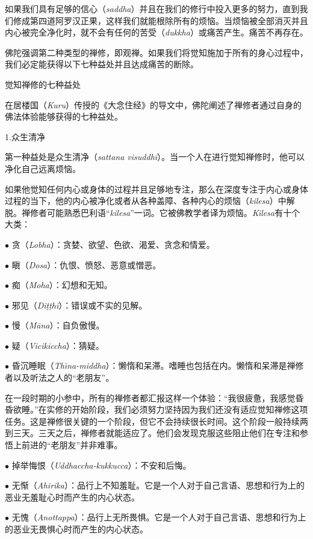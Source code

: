 如果我们具有足够的信心（{\it saddha}）并且在我们的修行中投入更多的努力，直到我们修成第四道阿罗汉正果，这样我们就能根除所有的烦恼。当烦恼被全部消灭并且内心被完全净化时，就不会有任何的苦受（{\it dukkha}）或痛苦产生。痛苦不再存在。

佛陀强调第二种类型的禅修，即观禅。如果我们将觉知施加于所有的身心过程中，我们必定能获得以下七种益处并且达成痛苦的断除。

\ssubsectnon 觉知禅修的七种益处

在居楼国（{\it Kuru}）传授的《大念住经》的导文中，佛陀阐述了禅修者通过自身的佛法体验能够获得的七种益处。

\sssubsectnon 1.众生清净

第一种益处是众生清净（{\it sattana visuddhi}）。当一个人在进行觉知\1禅修时，他可以净化自己远离烦恼。

如果他觉知任何内心或身体的过程并且足够地专注，那么在深度专注于内心或身体过程的当下，他的内心被净化或者从各种盖障、各种内心的烦恼（{\it kilesa}）中解脱。禅修者可能熟悉巴利语“{\it kilesa}”一词。它被佛教学者译为烦恼。{\it Kilesa}有十个大类：

{
\leftskip=1.2pc
\item{$\bullet$} 贪（{\it Lobha}）：贪婪、欲望、色欲、渴爱、贪念和情爱。
\item{$\bullet$} 瞋（{\it Dosa}）：仇恨、愤怒、恶意或憎恶。
\item{$\bullet$} 痴（{\it Moha}）：幻想和无知。
\item{$\bullet$} 邪见（{\it Di\d t\d thi}）：错误或不实的见解。
\item{$\bullet$} 慢（{\it M\=ana}）：自负傲慢。
\item{$\bullet$} 疑（{\it Vicikiccha}）：猜疑。
\item{$\bullet$} 昏沉睡眠（{\it Th\=\i na-middha}）：懒惰和呆滞。嗜睡也包括在内。懒惰和呆滞是禅修者以及听法之人的“老朋友”。

}

在一段时期的小参中，所有的禅修者都汇报这样一个体验：“我很疲惫，我感觉昏昏欲睡。”在实修的开始阶段，我们必须努力坚持因为我们还没有适应觉知禅修这项任务。这是禅修很关键的一个阶段，但它不会持续很长时间。这个阶段一般持续两到三天。三天之后，禅修者就能适应了。他们会发现克服这些阻止他们在专注和参悟上前进的“老朋友”并非难事。

{
\leftskip=1.2pc
\item{$\bullet$} 掉举悔恨（{\it Uddhaccha-kukkucca}）：不安和后悔。
\item{$\bullet$} 无惭（{\it Ahirika}）：品行上不知羞耻。它是\1一个人对于自己言语、思想和行为上的恶业无羞耻心时而产生的内心状态。
\item{$\bullet$} 无愧（{\it Anottappa}）：品行上无所畏惧。它是一个人对于自己言语、思想和行为上的恶业无畏惧心时而产生的内心状态。

}

